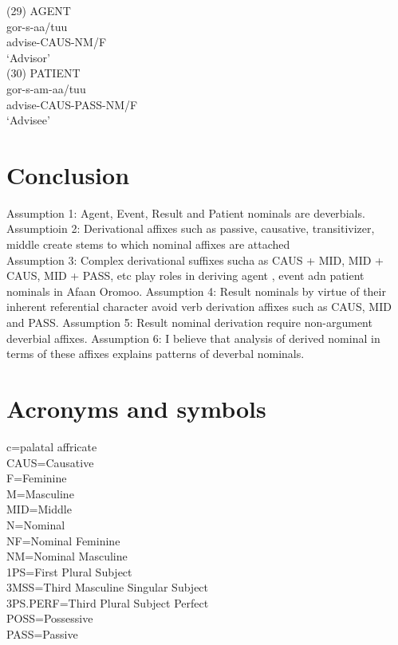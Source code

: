 \documentclass[11pt,a4paper]{article}
\begin{document}
(29) AGENT \\
\indent gor-s-aa/tuu \\
\indent advise-CAUS-NM/F\\
\indent ‘Advisor’\\

(30) PATIENT \\
\indent gor-s-am-aa/tuu\\
\indent advise-CAUS-PASS-NM/F\\
\indent ‘Advisee’\\ 



\section{Conclusion}

	Assumption 1: Agent, Event, Result and Patient nominals are deverbials.\\
Assumptioin 2: Derivational affixes such as passive, causative, transitivizer, middle create stems to which nominal affixes are attached\\
Assumption 3: Complex derivational suffixes sucha as CAUS + MID, MID + CAUS, MID + PASS, etc play roles in deriving agent , event adn patient nominals in Afaan Oromoo.
Assumption 4: Result nominals by virtue of their inherent referential character avoid verb derivation affixes such as CAUS, MID and PASS.
Assumption 5: Result nominal derivation require non-argument deverbial affixes. 
Assumption 6: I believe that analysis of derived nominal in terms of these affixes explains patterns of deverbal nominals. \\

\newpage



\newpage
\section*{Acronyms and symbols}
c=palatal affricate\\
CAUS=Causative\\
F=Feminine\\
M=Masculine\\
MID=Middle\\
N=Nominal\\
NF=Nominal Feminine\\
NM=Nominal Masculine\\
1PS=First Plural Subject\\
3MSS=Third Masculine Singular Subject\\
3PS.PERF=Third Plural Subject Perfect\\
POSS=Possessive\\
PASS=Passive\\
\end{document}
